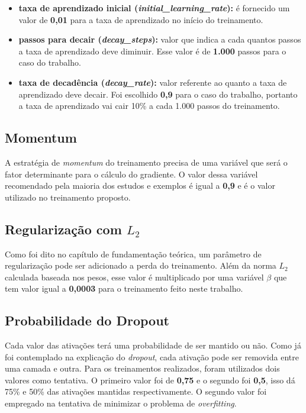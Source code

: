 \begin{itemize}
  
  \item {\bf taxa de aprendizado inicial
      (\emph{initial\_learning\_rate}):} é fornecido um valor de
    {\bf 0,01} para a taxa de aprendizado no início do treinamento.

  \item {\bf passos para decair (\emph{decay\_steps}):} valor que
    indica a cada quantos passos a taxa de aprendizado deve
    diminuir. Esse valor é de {\bf 1.000} passos para o caso do
    trabalho.

  \item {\bf taxa de decadência (\emph{decay\_rate}):} valor referente
    ao quanto a taxa de aprendizado deve decair. Foi escolhido {\bf
      0,9} para o caso do trabalho, portanto a taxa de aprendizado vai
    cair 10\% a cada 1.000 passos do treinamento.

\end{itemize}

\subsection{Momentum}

A estratégia de \textit{momentum} do treinamento precisa de uma
variável que será o fator determinante para o cálculo do gradiente. O
valor dessa variável recomendado pela maioria dos estudos e exemplos é
igual a {\bf 0,9} e é o valor utilizado no treinamento proposto.

\subsection{Regularização com $L_2$}

Como foi dito no capítulo de fundamentação teórica, um parâmetro de
regularização pode ser adicionado a perda do treinamento. Além da
norma $L_2$ calculada baseada nos pesos, esse valor é multiplicado por
uma variável $\beta$ que tem valor igual a {\bf 0,0003} para o
treinamento feito neste trabalho.

\subsection{Probabilidade do Dropout}

Cada valor das ativações terá uma probabilidade de ser mantido ou
não. Como já foi contemplado na explicação do \textit{dropout}, cada
ativação pode ser removida entre uma camada e outra. Para os
treinamentos realizados, foram utilizados dois valores como
tentativa. O primeiro valor foi de {\bf 0,75} e o segundo foi {\bf
  0,5}, isso dá 75\% e 50\% das ativações mantidas respectivamente. O
segundo valor foi empregado na tentativa de minimizar o problema de
\textit{overfitting}.

